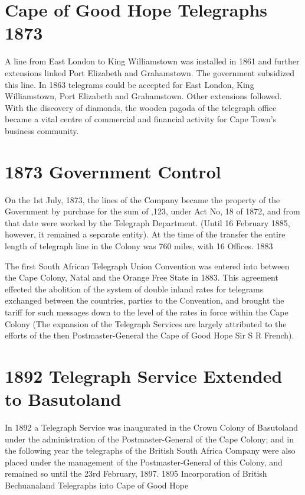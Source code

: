 \section{Cape of Good Hope Telegraphs 1873}

 
 
A line from East London to King Williamstown was installed in 1861 and 
further extensions linked Port Elizabeth and Grahamstown. The government 
subsidized this line. In 1863 telegrams could be accepted for East London, 
King Williamstown, Port Elizabeth and Grahamstown. Other extensions followed. 
With the discovery of diamonds, the wooden pagoda of the telegraph office became 
a vital centre of commercial and financial activity for Cape Town's 
business community.

\section{1873 Government Control}

On the 1st July, 1873, the lines of the Company became the property of the 
Government by purchase for the sum of ,123, under Act No, 18 of 1872, 
and  from that date were worked by the Telegraph Department. 
(Until 16 February 1885, however, 
it remained a separate entity). At the time of the transfer the entire 
length of telegraph 
line in the Colony was 760 miles, with 16 Offices.
1883

The first South African Telegraph Union Convention was entered into between 
the Cape Colony, Natal and the 
Orange Free State in 1883. This agreement effected the abolition of the 
system of double inland rates for telegrams exchanged between the countries, 
parties to the Convention, and brought the tariff for such messages down to 
the level of the rates in force within the Cape Colony
(The expansion of the Telegraph Services are largely attributed 
to the efforts of the then Postmaster-General the Cape of Good Hope Sir S R French).

\section{1892 Telegraph Service Extended to Basutoland}

In 1892 a Telegraph Service was inaugurated in the Crown Colony of 
Basutoland under the administration of the Postmaster-General of the 
Cape Colony; and in the following year the telegraphs of the British 
South Africa Company were also placed under the management of the 
Postmaster-General of this Colony, and remained so until the 23rd February, 1897.
1895 Incorporation of British Bechuanaland Telegraphs into Cape of Good Hope


